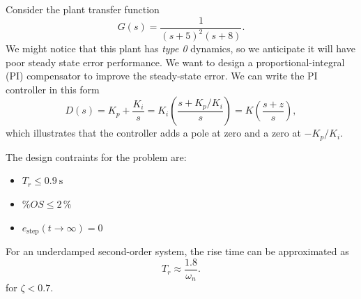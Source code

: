 \documentclass[11pt]{article}
\begin{document}
Consider the plant transfer function
\[
G(s) = \frac{1}{(s+5)^2 (s+8)}.
\]
We might notice that this plant has \emph{type 0} dynamics, so we anticipate it will have poor steady state error performance.
We want to design a proportional-integral (PI) compensator to improve the steady-state error.  We can write the PI controller in this form
\[
D(s) = K_p + \frac{K_i}{s} = K_i \left(\frac{s + K_p/K_i}{s}\right) = K \left(\frac{s+z}{s}\right),
\]
which illustrates that the controller adds a pole at zero and a zero at $-K_p/K_i$.

The design contraints for the problem are:
\begin{itemize}
\item $T_r \leq 0.9 \: \text{s}$
\item $\%OS \leq 2 \, \%$
\item $e_{\text{step}}(t \rightarrow \infty) = 0$
\end {itemize}


For an underdamped second-order system, the rise time can be approximated as
\[ T_r \approx \frac{1.8}{\omega_n}.
\]
for $\zeta < 0.7$.
\end{document}
